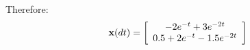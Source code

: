 Therefore:
\[
{\bf{x}}(dt) = \left[ {\begin{array}{*{20}c}
   { - 2e^{ - t}  + 3e^{ - 2t} }  \\
   {0.5 + 2e^{ - t}  - 1.5e^{ - 2t} }  \\
\end{array}} \right]
\]




